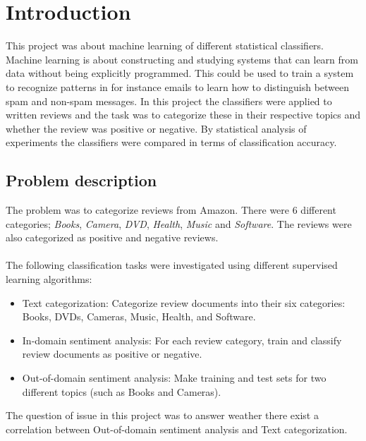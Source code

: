 \chapter{Introduction}
This project was about machine learning of different statistical classifiers. Machine learning is about constructing and studying systems that can learn from data without being explicitly programmed. This could be used to train a system to recognize patterns in for instance emails to learn how to distinguish between spam and non-spam messages. In this project the classifiers were applied to written reviews and the task was to categorize these in their respective topics and whether the review was positive or negative. By statistical analysis of experiments the classifiers were compared in terms of classification accuracy.
\section{Problem description}
The problem was to categorize reviews from Amazon. There were 6 different categories;
\textit{Books}, \textit{Camera}, \textit{DVD}, \textit{Health}, \textit{Music} and \textit{Software}. The reviews were also
categorized as positive and negative reviews. 
\\\\
The following classification tasks were investigated using different supervised learning algorithms:
\begin{itemize}
\item Text categorization: Categorize review documents into their six categories: Books, DVDs, Cameras, Music, Health, and Software.
\item In-domain sentiment analysis: For each review category, train and classify review documents as positive or negative. 
\item  Out-of-domain sentiment analysis: Make training and test sets for two different topics (such as Books and Cameras).
\end{itemize}
The question of issue in this project was to answer weather there exist a correlation between Out-of-domain sentiment analysis and Text categorization. 
\\\\
